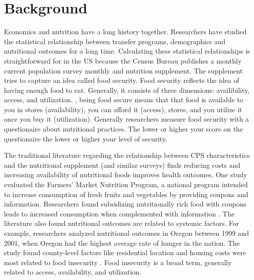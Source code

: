\documentclass{report}
\begin{document}
\section{Background}
Economics and nutrition have a long history together. Researchers have studied the statistical relationship between transfer programs, demographics and nutritional outcomes for a long time. Calculating these statistical relationships is straightforward for in the US because the Census Bureau publishes a monthly current population survey monthly and nutrition supplement. The supplement tries to capture an idea called food security. Food security reflects the idea of having enough food to eat. Generally, it consists of three dimensions: availibility, access, and utilization. , being food secure means that that food is available to you in stores (availability), you can afford it (access), stores, and you utilize it once you buy it (utilization). Generally researchers measure food security with a questionaire about nutritional practices. The lower or higher your score on the questionaire the lower or higher your level of security.
 
The traditional literature regarding the relationship between CPS characteristics and the nutritional supplement (and similar surveys) finds reducing costs and increasing availability of nutritional foods improves health outcomes. One study evaluated the Farmers' Market Nutrition Program, a national program intended to increase consumption of fresh fruits and vegetables by providing coupons and information. Researchers found subsidizing nutritionally rich food with coupons leads to increased consumption when complemented with information \cite{Just}. The literature also found nutritional outcomes are related to systemic factors. For example, researchers analyzed nutritional outcomes in Oregon between 1999 and 2001, when Oregon had the highest average rate of hunger in the nation. The study found county-level factors like residential location and housing costs were most related to food insecurity \cite{Bernell}. Food insecurity is a broad term, generally related to access, availability, and utilization.
\end{document}
